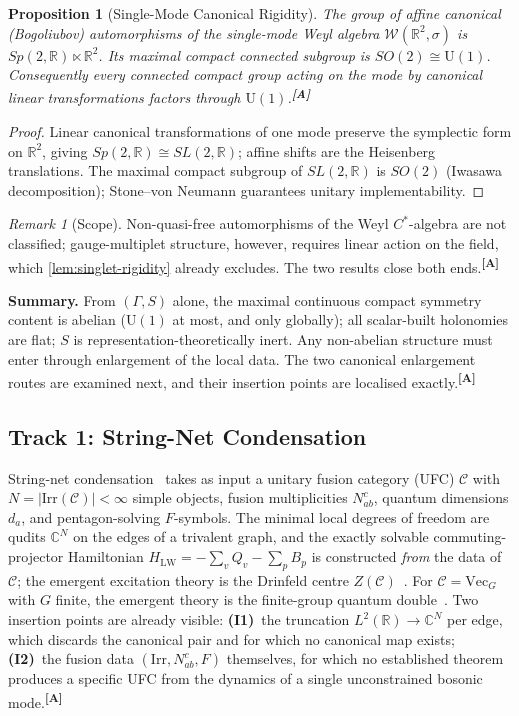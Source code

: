 \documentclass[12pt,a4paper,twoside]{article}
\theoremstyle{plain}
\newtheorem{proposition}[theorem]{Proposition}
\theoremstyle{definition}
\theoremstyle{remark}
\newtheorem{remark}[theorem]{Remark}
\newcommand{\catmark}[1]{\textsuperscript{\textsf{\textbf{[#1]}}}}
\begin{document}
\begin{proposition}[Single-Mode Canonical Rigidity]
\label{prop:single-mode-rigidity}
The group of affine canonical (Bogoliubov) automorphisms of the single-mode
Weyl algebra $\mathcal{W}(\mathbb{R}^2,\sigma)$ is
$Sp(2,\mathbb{R})\ltimes\mathbb{R}^2$. Its maximal compact connected
subgroup is $SO(2)\cong\mathrm{U}(1)$. Consequently every connected compact
group acting on the mode by canonical linear transformations factors through
$\mathrm{U}(1)$.\catmark{A}
\end{proposition}

\begin{proof}
Linear canonical transformations of one mode preserve the symplectic form on
$\mathbb{R}^2$, giving $Sp(2,\mathbb{R})\cong SL(2,\mathbb{R})$; affine
shifts are the Heisenberg translations. The maximal compact subgroup of
$SL(2,\mathbb{R})$ is $SO(2)$ (Iwasawa decomposition); Stone--von Neumann
guarantees unitary implementability.
\end{proof}

\begin{remark}[Scope]
Non-quasi-free automorphisms of the Weyl $C^{*}$-algebra are not classified;
gauge-multiplet structure, however, requires linear action on the field,
which \cref{lem:singlet-rigidity} already excludes. The two results close
both ends.\catmark{A}
\end{remark}

\noindent\textbf{Summary.} From $(\Gamma,S)$ alone, the maximal continuous
compact symmetry content is abelian ($\mathrm{U}(1)$ at most, and only
globally); all scalar-built holonomies are flat; $S$ is
representation-theoretically inert. Any non-abelian structure must enter
through enlargement of the local data. The two canonical enlargement routes
are examined next, and their insertion points are localised
exactly.\catmark{A}

\subsection{Track 1: String-Net Condensation}
\label{app:track1}

String-net condensation~\cite{levinwen2005} takes as input a unitary fusion
category (UFC) $\mathcal{C}$ with $N=|\mathrm{Irr}(\mathcal{C})|<\infty$
simple objects, fusion multiplicities $N_{ab}^{c}$, quantum dimensions
$d_a$, and pentagon-solving $F$-symbols. The minimal local degrees of
freedom are qudits $\mathbb{C}^{N}$ on the edges of a trivalent graph, and
the exactly solvable commuting-projector Hamiltonian
$H_{\mathrm{LW}}=-\sum_v Q_v-\sum_p B_p$ is constructed \emph{from} the data
of $\mathcal{C}$; the emergent excitation theory is the Drinfeld centre
$Z(\mathcal{C})$~\cite{mueger2003,levinwen2005}. For
$\mathcal{C}=\mathrm{Vec}_G$ with $G$ finite, the emergent theory is the
finite-group quantum double~\cite{kitaev2003}. Two insertion points are
already visible: \textbf{(I1)}~the truncation
$L^2(\mathbb{R})\to\mathbb{C}^{N}$ per edge, which discards the canonical
pair and for which no canonical map exists; \textbf{(I2)}~the fusion data
$(\mathrm{Irr},N_{ab}^{c},F)$ themselves, for which no established theorem
produces a specific UFC from the dynamics of a single unconstrained bosonic
mode.\catmark{A}
\end{document}
